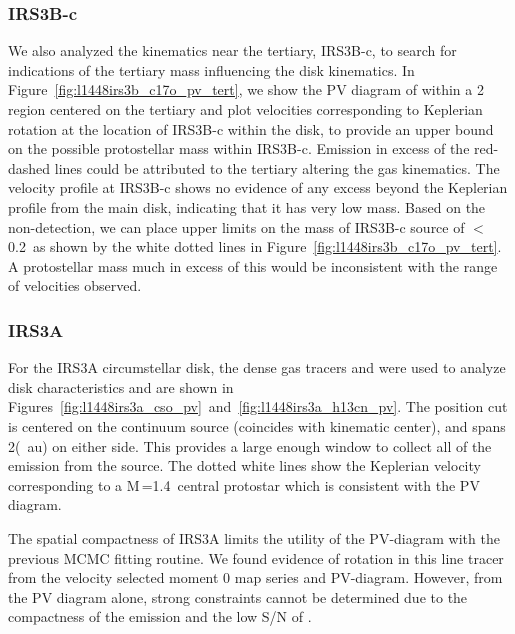 \documentclass[twocolumn, 12pt, trackchanges]{aastex63}
\begin{document}
\subsubsection{IRS3B-\lowercase{c}}
We also analyzed the \cso\space kinematics near the tertiary, IRS3B-c, to search for indications of the tertiary mass influencing the disk kinematics. In Figure~\ref{fig:l1448irs3b_c17o_pv_tert}, we show the PV diagram of \cso\space within a 2 region centered on the tertiary and plot velocities corresponding to Keplerian rotation at the location of IRS3B-c within the disk, to provide an upper bound on the possible protostellar mass within IRS3B-c. Emission in excess of the red-dashed lines could be attributed to the tertiary altering the gas kinematics. The velocity profile at IRS3B-c shows no evidence of any excess beyond the Keplerian profile from the main disk, indicating that it has very low mass. Based on the non-detection, we can place upper limits on the mass of  IRS3B-c source of $<$0.2~\solm\space as shown by the white dotted lines in Figure~\ref{fig:l1448irs3b_c17o_pv_tert}. A protostellar mass much in excess of this would be inconsistent with the range of velocities observed.

\subsubsection{IRS3A}
For the IRS3A circumstellar disk, the dense gas tracers \htcn\space and \cso\space were used to analyze disk characteristics and are shown in Figures~\ref{fig:l1448irs3a_cso_pv}~and~\ref{fig:l1448irs3a_h13cn_pv}. The position cut is centered on the continuum source (coincides with kinematic center), and spans 2\arcsec (~au) on either side. This provides a large enough window to collect all of the emission from the source. The dotted white lines show the Keplerian velocity corresponding to a M$_{\*}$=1.4~\solm\space central protostar which is consistent with the PV diagram.

The spatial compactness of IRS3A limits the utility of the \htcn\space PV-diagram with the previous MCMC fitting routine. We found evidence of rotation in this line tracer from the velocity selected moment 0 map series and PV-diagram. However, from the PV diagram alone, strong constraints cannot be determined due to the compactness of the \htcn\space emission and the low S/N of \cso.


\end{document}
